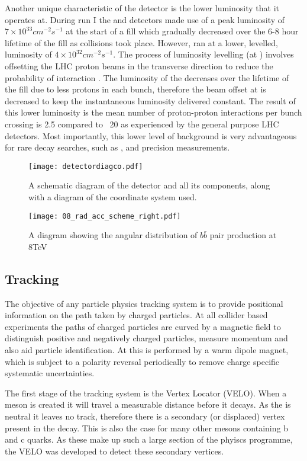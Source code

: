 Another unique characteristic of the \lhcb detector is the lower luminosity that it operates at.  During run I the \atlas and \cms detectors made use of a peak luminosity of $7\times 10^{33}cm^{-2}s^{-1}$ at the start of a fill which gradually decreased over the 6-8 hour lifetime of the fill as collisions took place.  However, \lhcb ran at a lower, levelled, luminosity of $4\times 10^{32}cm^{-2}s^{-1}$.  The process of luminosity levelling (at \lhcb) involves offsetting the LHC proton beams in the transverse direction to reduce the probability of interaction \cite{Follin:2014nva}.  The luminosity of the \lhc decreases over the lifetime of the fill due to less protons in each bunch, therefore the beam offset at \lhcb is decreased to keep the instantaneous luminosity delivered constant.  The result of this lower luminosity is the mean number of proton-proton interactions per bunch crossing is 2.5 compared to ~20 as experienced by the general purpose LHC detectors.  Most importantly, this lower level of background is very advantageous for rare decay searches, such as \Bs \to \muon \muon, and precision measurements.
\begin{figure}[h]
  \centering
  \texttt{[image: detectordiagco.pdf]}
  \caption{ A schematic diagram of the \lhcb detector and all its components, along with a diagram of the coordinate system used.}
  \label{fig:detectdiag}
\end{figure}
\begin{figure}[h]
  \centering
  \texttt{[image: 08\_rad\_acc\_scheme\_right.pdf]}
  \caption{A diagram showing the angular distribution of $b \bar{b}$ pair production at 8TeV}
  \label{fig:bbarprod}
\end{figure}
\subsection{Tracking}
\label{sec:Tracking}
The objective of any particle physics tracking system is to provide positional information on the path taken by charged particles.  At all collider based experiments the paths of charged particles are curved by a magnetic field to distinguish positive and negatively charged particles, measure momentum and also aid particle identification.  At \lhcb this is performed by a warm dipole magnet, which is subject to a polarity reversal periodically to remove charge specific systematic uncertainties.

The first stage of the \lhcb tracking system is the Vertex Locator (VELO).  When a \Bd meson is created it will travel a measurable distance before it decays.  As the \Bd is neutral it leaves no track, therefore there is a secondary (or displaced) vertex present in the decay.  This is also the case for many other mesons containing b and c quarks.  As these make up such a large section of the \lhcb phyiscs programme, the VELO was developed to detect these secondary vertices.

